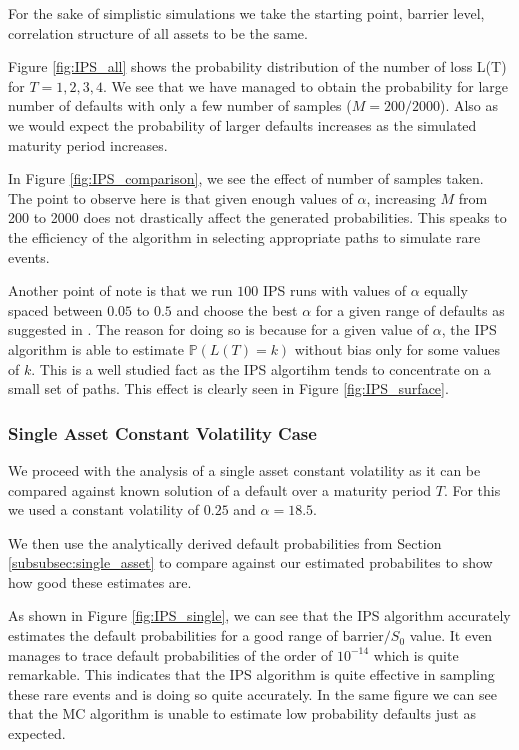 For the sake of simplistic simulations we take the starting point, barrier
level, correlation structure of all assets to be the same.

Figure \ref{fig:IPS_all} shows the probability distribution of the number of
loss L(T) for $T = 1, 2, 3, 4$. We see that we have managed to obtain the
probability for large number of defaults with only a few number of samples ($M =
200/2000$). Also as we would expect the probability of larger defaults increases
as the simulated maturity period increases.

In Figure \ref{fig:IPS_comparison}, we see the effect of number of samples
taken. The point to observe here is that given enough values of $\alpha$, 
increasing $M$ from 200 to 2000 does not drastically affect the generated
probabilities. This speaks to the efficiency of the algorithm in selecting
appropriate paths to simulate rare events.

Another point of note is that we run $100$ IPS runs with values of $\alpha$
equally spaced between $0.05$ to $0.5$ and choose the best $\alpha$ for a given
range of defaults as suggested in \cite{carmona2009importance}. The reason for 
doing so is because for a given value of $\alpha$, the IPS algorithm is able to 
estimate $\mathbb{P}(L(T) = k)$ without bias only for some values of $k$. This
is a well studied fact as the IPS algortihm tends to concentrate on a small set
of paths. This effect is clearly seen in Figure \ref{fig:IPS_surface}.

\subsubsection{Single Asset Constant Volatility Case}
We proceed with the analysis of a single asset constant volatility as it can be
compared against known solution of a default over a maturity period $T$. For
this we used a constant volatility of $0.25$ and $\alpha = 18.5$.

We then use the analytically derived default probabilities from Section
\ref{subsubsec:single_asset} to compare against our estimated probabilites to
show how good these estimates are.

As shown in Figure \ref{fig:IPS_single},  we can see that the IPS algorithm
accurately estimates the default probabilities for a good range of
$\text{barrier}/S_0$ value. It even manages to trace default probabilities of the 
order of $10^{-14}$ which is quite remarkable. This indicates that the IPS
algorithm is quite effective in sampling these rare events and is doing so quite
accurately. In the same figure we can see that the MC algorithm is unable to
estimate low probability defaults just as expected.

